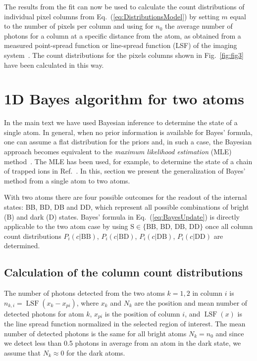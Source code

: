 \documentclass[aps,prl,twocolumn,english,showpacs]{revtex4-1}
\begin{document}
The results from the fit can now be used to calculate the count distributions of individual pixel columns from Eq.~(\ref{eq:DistributionsModel}) by setting $m$ equal to the number of pixels per column and using for $n_0$ the average number of photons for a column at a specific distance from the atom, as obtained from a measured point-spread function or line-spread function (LSF) of the imaging system~\cite{Alberti2016SuperResolution}. The count distributions for the pixels columns shown in Fig.~\ref{fig:fig3} have been calculated in this way.

\section{1D Bayes algorithm for two atoms}

In the main text we have used Bayesian inference to determine the state of a single atom. In general, when no prior information is available for Bayes' formula, one can assume a flat distribution for the priors and, in such a case, the Bayesian approach becomes equivalent to the \emph{maximum likelihood estimation} (MLE) method~\cite{sivia2006data}. The MLE has been used, for example, to determine the state of a chain of trapped ions in Ref.~\cite{burrell2010}. In this, section we present the generalization of Bayes' method from a single atom to two atoms.

With two atoms there are four possible outcomes for the readout of the internal states: BB, BD, DB and DD, which represent all possible combinations of bright (B) and dark (D) states. Bayes' formula in Eq.~(\ref{eq:BayesUpdate}) is directly applicable to the two atom case by using $\text{S} \in\{\text{BB, BD, DB, DD}\}$ once all column count distributions $P_{i}(c|\text{BB})$,  $P_{i}(c|\text{BD})$,  $P_{i}(c|\text{DB})$,  $P_{i}(c|\text{DD})$ are determined.

\subsection{Calculation of the column count distributions}

The number of photons detected from the two atoms $k=1,2$ in column $i$ is $n_{k,i} = \operatorname{LSF}(x_k-x_{pi})$, where $x_k$ and $N_k$ are the position and mean number of detected photons for atom $k$, $x_{pi}$ is the position of column $i$, and $\operatorname{LSF}(x)$ is the line spread function normalized in the selected region of interest. The mean number of detected photons is the same for all bright atoms  $N_k=n_0$  and since we detect less than 0.5 photons in average from an atom in the dark state, we assume that $N_k\approx0$ for the dark atoms. 
\end{document}
